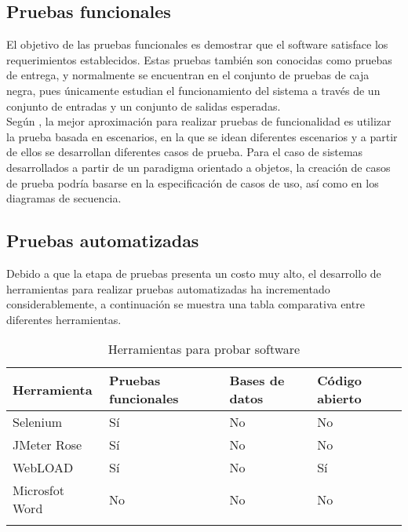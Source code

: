 \subsection{Pruebas funcionales}

El objetivo de las pruebas funcionales es demostrar que el software satisface los requerimientos establecidos. Estas pruebas también son conocidas como pruebas de entrega, y normalmente se encuentran en el conjunto de pruebas de caja negra, pues únicamente estudian el funcionamiento del sistema a través de un conjunto de entradas y un conjunto de salidas esperadas.\\

Según \cite{sommerville1992software}, la mejor aproximación para realizar pruebas de funcionalidad es utilizar la prueba basada en escenarios, en la que se idean diferentes escenarios y a partir de ellos se desarrollan diferentes casos de prueba. Para el caso de sistemas desarrollados a partir de un paradigma orientado a objetos, la creación de casos de prueba podría basarse en la especificación de casos de uso, así como en los diagramas de secuencia.


\subsection{Pruebas automatizadas}

Debido a que la etapa de pruebas presenta un costo muy alto, el desarrollo de herramientas para realizar pruebas automatizadas ha incrementado considerablemente, a continuación se muestra una tabla comparativa entre diferentes herramientas.

\begin{longtable}{| p{} | p{} | p{} | p{} |}%
	\arrayrulecolor{black}%
	\rowcolor{black}%
	{\color{white}Herramienta} & {\color{white}Pruebas funcionales} & {\color{white}Bases de datos} & {\color{white}Código abierto}\\ \hline
	\endhead%
	\arrayrulecolor{black}%
	Selenium & Sí & No & No\\ \hline
	JMeter Rose & Sí & No & No\\ \hline
	WebLOAD &  Sí & No & Sí\\ \hline
	Microsfot Word &  No & No & No\\ \hline
	\caption{Herramientas para probar software}\label{fig:tablaAnalisis}
\end{longtable}%

